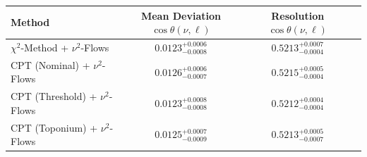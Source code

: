     \begin{tabular}{lccc}
        \toprule
        Method & Mean Deviation $\cos\theta(\nu, \ell)$ & Resolution $\cos\theta(\nu, \ell)$ \\
        \midrule
        $\chi^2$-Method + $\nu^2$-Flows & $0.0123^{+0.0006}_{-0.0008}$ & $0.5213^{+0.0007}_{-0.0004}$ \\
        CPT (Nominal) + $\nu^2$-Flows & $0.0126^{+0.0006}_{-0.0007}$ & $0.5215^{+0.0005}_{-0.0004}$ \\
        CPT (Threshold) + $\nu^2$-Flows & $0.0123^{+0.0008}_{-0.0008}$ & $0.5212^{+0.0004}_{-0.0004}$ \\
        CPT (Toponium) + $\nu^2$-Flows & $0.0125^{+0.0007}_{-0.0009}$ & $0.5213^{+0.0005}_{-0.0007}$ \\
        \bottomrule
    \end{tabular}